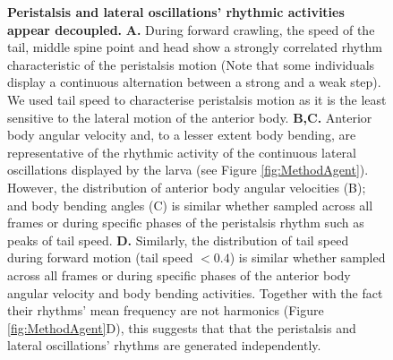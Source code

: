 \documentclass[11pt,a4paper]{article}
\newcommand{\beginsupplement}{%
        \setcounter{table}{0}
        \renewcommand{\thetable}{S\arabic{table}}%
        \setcounter{figure}{0}
        \renewcommand{\thefigure}{S\arabic{figure}}%
     }
\begin{document}
%
%

\setcounter{figure}{0}
\renewcommand{\figurename}{Figure 1 Supplement}
\setcounter{figure}{0}

\begin{figure}[ht!]
\begin{center}
\caption{ {\bf Peristalsis and lateral oscillations’ rhythmic activities appear decoupled.}
{\bf A.} During forward crawling, the speed of the tail, middle spine point and head show a strongly correlated rhythm characteristic of the peristalsis motion (Note that some individuals display a continuous alternation between a strong and a weak step). We used tail speed to characterise peristalsis motion as it is the least sensitive to the lateral motion of the anterior body.
{\bf B,C.} Anterior body angular velocity and, to a lesser extent body bending, are representative of the rhythmic activity of the continuous lateral oscillations displayed by the larva (see Figure \ref{fig:MethodAgent}). However, the distribution of anterior body angular velocities (B); and body bending angles (C) is similar whether sampled across all frames or during specific phases of the peristalsis rhythm such as peaks of tail speed. {\bf D.} Similarly, the distribution of tail speed during forward motion (tail speed $< 0.4$) is similar whether sampled across all frames or during specific phases of the anterior body angular velocity and body bending activities. Together with the fact their rhythms’ mean frequency are not harmonics (Figure \ref{fig:MethodAgent}D), this suggests that that the peristalsis and lateral oscillations’ rhythms are generated independently.
 \label{fig1S:FigS1}}
\end{center}
\end{figure}
\end{document}
